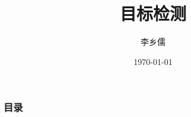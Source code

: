 \documentclass{beamer}%
\title[目标检测]{目标检测}
\author{\large 李乡儒} %
\institute[SCNU]{\small
华南师范大学计算机学院
}
\date{\today}
\begin{document}
\graphicspath{{figures/}}

\begin{frame}%
    \titlepage
\end{frame}

\begin{frame}[allowframebreaks]
    \frametitle{\textsc{目录}} \vspace{-0.3cm}
    \begin{spacing}{0.0}
        \tableofcontents[hideallsubsections]
    \end{spacing}   %
\end{frame}










\end{document}
